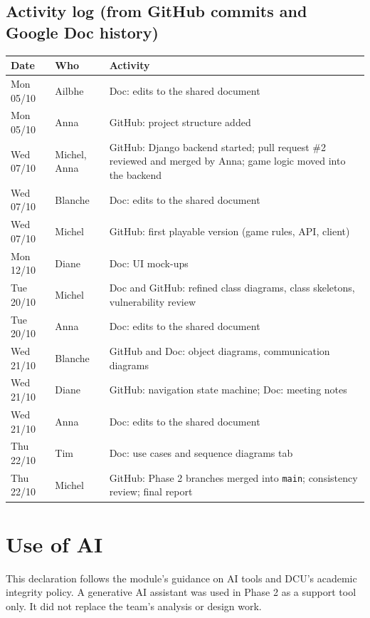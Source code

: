 \documentclass[11pt,a4paper]{article}
\begin{document}
\subsection{Activity log (from GitHub commits and Google Doc history)}
\small
\begin{tabularx}{\textwidth}{l l L}
\toprule
\textbf{Date} & \textbf{Who} & \textbf{Activity}\\ \midrule
Mon 05/10 & Ailbhe & Doc: edits to the shared document\\
Mon 05/10 & Anna & GitHub: project structure added\\
Wed 07/10 & Michel, Anna & GitHub: Django backend started; pull request \#2 reviewed and merged by Anna; game logic moved into the backend\\
Wed 07/10 & Blanche & Doc: edits to the shared document\\
Wed 07/10 & Michel & GitHub: first playable version (game rules, API, client)\\
Mon 12/10 & Diane & Doc: UI mock-ups\\
Tue 20/10 & Michel & Doc and GitHub: refined class diagrams, class skeletons, vulnerability review\\
Tue 20/10 & Anna & Doc: edits to the shared document\\
Wed 21/10 & Blanche & GitHub and Doc: object diagrams, communication diagrams\\
Wed 21/10 & Diane & GitHub: navigation state machine; Doc: meeting notes\\
Wed 21/10 & Anna & Doc: edits to the shared document\\
Thu 22/10 & Tim & Doc: use cases and sequence diagrams tab\\
Thu 22/10 & Michel & GitHub: Phase 2 branches merged into \texttt{main}; consistency review; final report\\
\bottomrule
\end{tabularx}
\normalsize

\section{Use of AI}\label{sec:ai}

This declaration follows the module's guidance on AI tools and DCU's academic integrity policy. A generative AI assistant was used in Phase 2 as a support tool only. It did not replace the team's analysis or design work.
\end{document}

